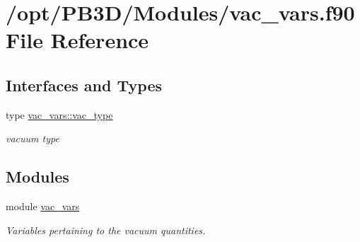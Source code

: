 \hypertarget{vac__vars_8f90}{}\section{/opt/\+P\+B3\+D/\+Modules/vac\+\_\+vars.f90 File Reference}
\label{vac__vars_8f90}
\subsection*{Interfaces and Types}
\begin{DoxyCompactItemize}
\item 
type \hyperlink{structvac__vars_1_1vac__type}{vac\+\_\+vars\+::vac\+\_\+type}
\begin{DoxyCompactList}\small\item\em vacuum type \end{DoxyCompactList}\end{DoxyCompactItemize}
\subsection*{Modules}
\begin{DoxyCompactItemize}
\item 
module \hyperlink{namespacevac__vars}{vac\+\_\+vars}
\begin{DoxyCompactList}\small\item\em Variables pertaining to the vacuum quantities. \end{DoxyCompactList}\end{DoxyCompactItemize}
